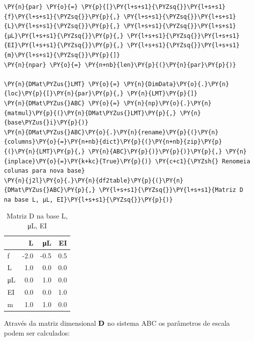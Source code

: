     \begin{tcolorbox}[breakable, size=fbox, boxrule=1pt, pad at break*=1mm,colback=cellbackground, colframe=cellborder]
\begin{Verbatim}[commandchars=\\\{\}]
\PY{n}{par} \PY{o}{=} \PY{p}{[}\PY{l+s+s1}{\PYZsq{}}\PY{l+s+s1}{f}\PY{l+s+s1}{\PYZsq{}}\PY{p}{,} \PY{l+s+s1}{\PYZsq{}}\PY{l+s+s1}{L}\PY{l+s+s1}{\PYZsq{}}\PY{p}{,} \PY{l+s+s1}{\PYZsq{}}\PY{l+s+s1}{μL}\PY{l+s+s1}{\PYZsq{}}\PY{p}{,} \PY{l+s+s1}{\PYZsq{}}\PY{l+s+s1}{EI}\PY{l+s+s1}{\PYZsq{}}\PY{p}{,} \PY{l+s+s1}{\PYZsq{}}\PY{l+s+s1}{m}\PY{l+s+s1}{\PYZsq{}}\PY{p}{]}
\PY{n}{npar} \PY{o}{=} \PY{n+nb}{len}\PY{p}{(}\PY{n}{par}\PY{p}{)}

\PY{n}{DMat\PYZus{}LMT} \PY{o}{=} \PY{n}{DimData}\PY{o}{.}\PY{n}{loc}\PY{p}{[}\PY{n}{par}\PY{p}{,} \PY{n}{LMT}\PY{p}{]}
\PY{n}{DMat\PYZus{}ABC} \PY{o}{=} \PY{n}{np}\PY{o}{.}\PY{n}{matmul}\PY{p}{(}\PY{n}{DMat\PYZus{}LMT}\PY{p}{,} \PY{n}{base\PYZus{}i}\PY{p}{)}
\PY{n}{DMat\PYZus{}ABC}\PY{o}{.}\PY{n}{rename}\PY{p}{(}\PY{n}{columns}\PY{o}{=}\PY{n+nb}{dict}\PY{p}{(}\PY{n+nb}{zip}\PY{p}{(}\PY{n}{LMT}\PY{p}{,} \PY{n}{ABC}\PY{p}{)}\PY{p}{)}\PY{p}{,} \PY{n}{inplace}\PY{o}{=}\PY{k+kc}{True}\PY{p}{)} \PY{c+c1}{\PYZsh{} Renomeia colunas para nova base}
\PY{n}{j2l}\PY{o}{.}\PY{n}{df2table}\PY{p}{(}\PY{n}{DMat\PYZus{}ABC}\PY{p}{,} \PY{l+s+s1}{\PYZsq{}}\PY{l+s+s1}{Matriz D na base L, μL, EI}\PY{l+s+s1}{\PYZsq{}}\PY{p}{)}
\end{Verbatim}
\end{tcolorbox}

    
    \begin{table}[h!]
    \centering
    \caption{Matriz D na base L, μL, EI}
    {\begin{tabular}{lrrr}
\toprule
{} &    L &   μL &   EI \\
\midrule
f  & -2.0 & -0.5 &  0.5 \\
L  &  1.0 &  0.0 &  0.0 \\
μL &  0.0 &  1.0 &  0.0 \\
EI &  0.0 &  0.0 &  1.0 \\
m  &  1.0 &  1.0 &  0.0 \\
\bottomrule
\end{tabular}
}
    \label{}
    \end{table}
    

    
    Através da matriz dimensional \(\bf D\) no sistema ABC os parâmetros de
escala podem ser calculados:

